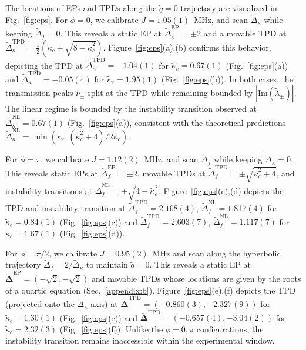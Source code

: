 \documentclass[%
  reprint,
  amsmath,amssymb,
  aps,
  prapplied,
  superscriptaddress,
  longbibliography]{revtex4-2}
\begin{document}
The locations of EPs and TPDs along the $\tilde{q} = 0$ trajectory are visualized in Fig.~\ref{fig:eps}. For $\phi = 0$, we calibrate $J=1.05(1)$~MHz, and scan $\tilde{\Delta}_\kappa$ while keeping $\tilde{\Delta}_f = 0$. This reveals a static EP at $\tilde{\Delta}_\kappa^\text{EP}=\pm 2$ and a movable TPD at $\tilde{\Delta}_\kappa^\text{TPD} = \frac{1}{2}(\tilde{\kappa}_c \pm \sqrt{8 - \tilde{\kappa}_c^2})$. Figure~\ref{fig:eps}(a),(b) confirms this behavior, depicting the TPD at $\tilde{\Delta}_\kappa^\text{TPD} = -1.04(1)$ for $\tilde{\kappa}_c = 0.67(1)$ (Fig.~\ref{fig:eps}(a)) and $\tilde{\Delta}_\kappa^\text{TPD} = -0.05(4)$ for $\tilde{\kappa}_c = 1.95(1)$ (Fig.~\ref{fig:eps}(b)). In both cases, the transmission peaks $\tilde{\nu}_\pm$ split at the TPD while remaining bounded by $|\text{Im}(\tilde{\lambda}_\pm)|$. The linear regime is bounded by the instability transition observed at $\tilde{\Delta}_\kappa^\text{NL} = 0.67(1)$ (Fig.~\ref{fig:eps}(a)), consistent with the theoretical predictions $\tilde{\Delta}_\kappa^\text{NL} = \min(\tilde{\kappa}_c, (\tilde{\kappa}_c^2 + 4)/2\tilde{\kappa}_c)$.

For $\phi = \pi$, we calibrate $J=1.12(2)$~MHz, and scan $\tilde{\Delta}_f$ while keeping $\tilde{\Delta}_\kappa = 0$. This reveals static EPs at $\tilde{\Delta}_f^\text{EP} = \pm 2$, movable TPDs at $\tilde{\Delta}_f^\text{TPD} = \pm \sqrt{\tilde{\kappa}_c^2 + 4}$, and instability transitions at $\tilde{\Delta}_f^\text{NL} = \pm \sqrt{4 - \tilde{\kappa}_c^2}$. Figure~\ref{fig:eps}(c),(d) depicts the TPD and instability transition at $\tilde{\Delta}_f^\text{TPD} = 2.168(4)$, $\tilde{\Delta}_f^\text{NL} = 1.817(4)$ for $\tilde{\kappa}_c = 0.84(1)$ (Fig.~\ref{fig:eps}(c)) and $\tilde{\Delta}_f^\text{TPD} = 2.603(7)$, $\tilde{\Delta}_f^\text{NL} = 1.117(7)$ for $\tilde{\kappa}_c = 1.67(1)$ (Fig.~\ref{fig:eps}(d)). 

For $\phi = \pi/2$, we calibrate $J=0.95(2)$~MHz and scan along the hyperbolic trajectory $\tilde{\Delta}_f = 2/\tilde{\Delta}_\kappa$ to maintain $\tilde{q} = 0$. This reveals a static EP at $\boldsymbol{\tilde{\Delta}}^\text{EP} = (-\sqrt{2}, -\sqrt{2})$ and movable TPDs whose locations are given by the roots of a quartic equation (Sec.~\ref{appendix:b}). Figure~\ref{fig:eps}(e),(f) depicts the TPD (projected onto the $\tilde{\Delta}_\kappa$ axis) at $\boldsymbol{\tilde{\Delta}}^\text{TPD} = (-0.860(3), -2.327(9))$ for $\tilde{\kappa}_c = 1.30(1)$ (Fig.~\ref{fig:eps}(e)) and $\boldsymbol{\tilde{\Delta}}^\text{TPD} = (-0.657(4), -3.04(2))$ for $\tilde{\kappa}_c = 2.32(3)$ (Fig.~\ref{fig:eps}(f)). Unlike the $\phi = 0, \pi$ configurations, the instability transition remains inaccessible within the experimental window.
\end{document}
